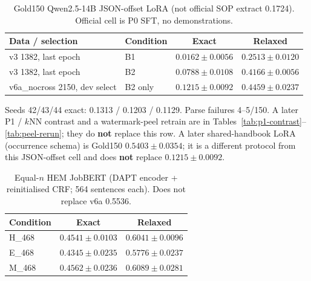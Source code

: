 \begin{table}[t]
\caption{Gold150 Qwen2.5-14B JSON-offset LoRA (not official SOP extract 0.1724). Official cell is P0 SFT, no demonstrations.}
\label{tab:gold150-qwen}
\centering
\begin{tabular}{llcc}
\hline
Data / selection & Condition & Exact & Relaxed \\
\hline
v3 1382, last epoch & B1 & $0.0162\pm0.0056$ & $0.2513\pm0.0120$ \\
v3 1382, last epoch & B2 & $0.0788\pm0.0108$ & $0.4166\pm0.0056$ \\
v6a\_nocross 2150, dev select & B2 only & $\mathbf{0.1215\pm0.0092}$ & $0.4459\pm0.0237$ \\
\hline
\end{tabular}

\vspace{0.4em}
{\small Seeds 42/43/44 exact: 0.1313 / 0.1203 / 0.1129.
Parse failures 4--5/150.
A later P1 / $k$NN contrast and a watermark-peel retrain are in Tables~\ref{tab:p1-contrast}--\ref{tab:peel-rerun}; they do \textbf{not} replace this row.
A later shared-handbook LoRA (occurrence schema) is Gold150 $0.5403\pm0.0354$; it is a different protocol from this JSON-offset cell and does \textbf{not} replace $0.1215\pm0.0092$.}
\end{table}

\begin{table}[t]
\caption{Equal-$n$ HEM JobBERT (DAPT encoder + reinitialised CRF; 564 sentences each). Does not replace v6a 0.5536.}
\label{tab:hem}
\centering
\begin{tabular}{lcc}
\hline
Condition & Exact & Relaxed \\
\hline
H\_468 & $0.4541\pm0.0103$ & $0.6041\pm0.0096$ \\
E\_468 & $0.4345\pm0.0235$ & $0.5776\pm0.0237$ \\
M\_468 & $0.4562\pm0.0236$ & $0.6089\pm0.0281$ \\
\hline
\end{tabular}
\end{table}
